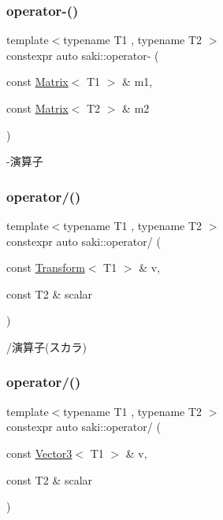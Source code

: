 \subsubsection{\texorpdfstring{operator-\/()}{operator-()}\hspace{0.1cm}{\footnotesize\ttfamily [5/5]}}
{\footnotesize\ttfamily template$<$typename T1 , typename T2 $>$ \\
constexpr auto saki\+::operator-\/ (\begin{DoxyParamCaption}\item[{const \mbox{\hyperlink{classsaki_1_1_matrix}{Matrix}}$<$ T1 $>$ \&}]{m1,  }\item[{const \mbox{\hyperlink{classsaki_1_1_matrix}{Matrix}}$<$ T2 $>$ \&}]{m2 }\end{DoxyParamCaption})}



-\/演算子 

\mbox{\label{namespacesaki_a1a09a61ecb48d44bcb9dc201ab30216b}} 
\subsubsection{\texorpdfstring{operator/()}{operator/()}\hspace{0.1cm}{\footnotesize\ttfamily [1/8]}}
{\footnotesize\ttfamily template$<$typename T1 , typename T2 $>$ \\
constexpr auto saki\+::operator/ (\begin{DoxyParamCaption}\item[{const \mbox{\hyperlink{classsaki_1_1_transform}{Transform}}$<$ T1 $>$ \&}]{v,  }\item[{const T2 \&}]{scalar }\end{DoxyParamCaption})}



/演算子(スカラ) 

\mbox{\label{namespacesaki_abbbafb6bb5e04aa715db728862e079a8}} 
\subsubsection{\texorpdfstring{operator/()}{operator/()}\hspace{0.1cm}{\footnotesize\ttfamily [2/8]}}
{\footnotesize\ttfamily template$<$typename T1 , typename T2 $>$ \\
constexpr auto saki\+::operator/ (\begin{DoxyParamCaption}\item[{const \mbox{\hyperlink{classsaki_1_1_vector3}{Vector3}}$<$ T1 $>$ \&}]{v,  }\item[{const T2 \&}]{scalar }\end{DoxyParamCaption})}



